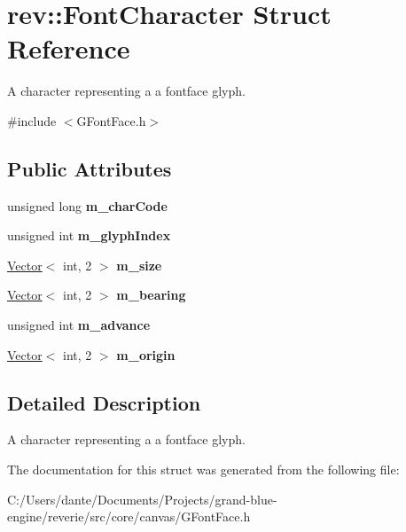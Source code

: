 \hypertarget{structrev_1_1_font_character}{}\section{rev\+::Font\+Character Struct Reference}
\label{structrev_1_1_font_character}


A character representing a a fontface glyph.  




{\ttfamily \#include $<$G\+Font\+Face.\+h$>$}

\subsection*{Public Attributes}
\begin{DoxyCompactItemize}
\item 
\mbox{\label{structrev_1_1_font_character_a229dd9ae59eb77b2530fbf8bb4f4f2b4}} 
unsigned long {\bfseries m\+\_\+char\+Code}
\item 
\mbox{\label{structrev_1_1_font_character_ad50bef71556ecd905e9310bc25c757b9}} 
unsigned int {\bfseries m\+\_\+glyph\+Index}
\item 
\mbox{\label{structrev_1_1_font_character_ad8eb74750e0bbc2a8c172e1df5c5e936}} 
\mbox{\hyperlink{classrev_1_1_vector}{Vector}}$<$ int, 2 $>$ {\bfseries m\+\_\+size}
\item 
\mbox{\label{structrev_1_1_font_character_aa4d74f6af140b133e8d07ed31be3bec8}} 
\mbox{\hyperlink{classrev_1_1_vector}{Vector}}$<$ int, 2 $>$ {\bfseries m\+\_\+bearing}
\item 
\mbox{\label{structrev_1_1_font_character_aae6a07f9bf0a749a0e23ccaa3cb62a60}} 
unsigned int {\bfseries m\+\_\+advance}
\item 
\mbox{\label{structrev_1_1_font_character_a64f0b940fee416bfe1bef7f1f0603c33}} 
\mbox{\hyperlink{classrev_1_1_vector}{Vector}}$<$ int, 2 $>$ {\bfseries m\+\_\+origin}
\end{DoxyCompactItemize}


\subsection{Detailed Description}
A character representing a a fontface glyph. 

The documentation for this struct was generated from the following file\+:\begin{DoxyCompactItemize}
\item 
C\+:/\+Users/dante/\+Documents/\+Projects/grand-\/blue-\/engine/reverie/src/core/canvas/G\+Font\+Face.\+h\end{DoxyCompactItemize}
